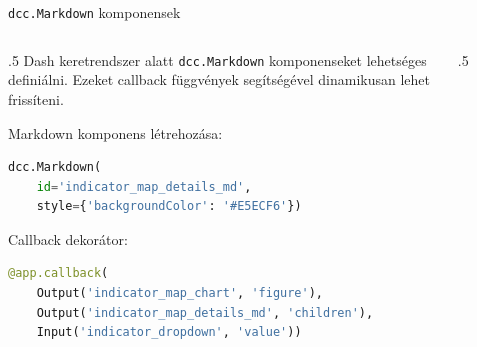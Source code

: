 \documentclass[english, aspectratio=169]{beamer}
\begin{document}

\begin{frame}[fragile]{\texttt{dcc.Markdown} komponensek}
	\begin{columns}
		\begin{column}{.5\textwidth}
			Dash keretrendszer alatt \texttt{dcc.Markdown} komponenseket lehetséges definiálni. Ezeket callback függvények segítségével dinamikusan lehet frissíteni.\par\smallskip
			Markdown komponens létrehozása:
			\begin{lstlisting}[language=python]
dcc.Markdown(
	id='indicator_map_details_md',
	style={'backgroundColor': '#E5ECF6'})				
			\end{lstlisting}
			Callback dekorátor:
			\begin{lstlisting}[language=python]
@app.callback(
	Output('indicator_map_chart', 'figure'),
	Output('indicator_map_details_md', 'children'),
	Input('indicator_dropdown', 'value'))
			\end{lstlisting}
		\end{column}
		\begin{column}{.5\textwidth}
			\begin{lstlisting}[language=python]
				
			\end{lstlisting}
		\end{column}
	\end{columns}
\end{frame}
\end{document}
